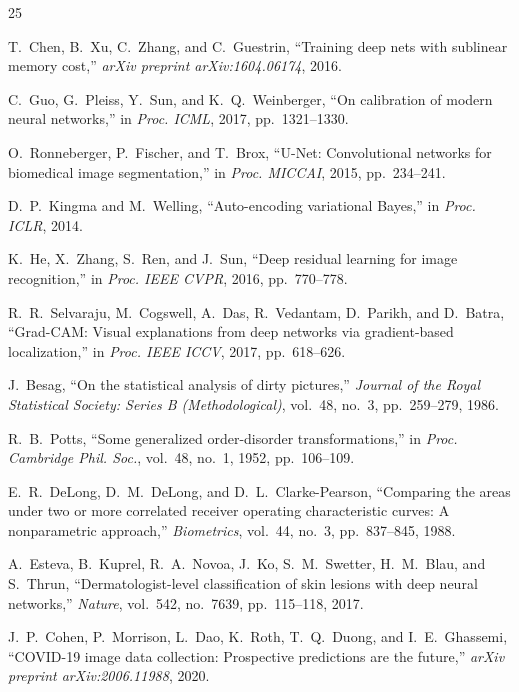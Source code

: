 \documentclass[conference]{IEEEtran}
\renewenvironment{thebibliography}[1]{%
  \begin{oldthebibliography}{#1}%
    \setlength{\itemsep}{0.3pt}%
    \setlength{\parskip}{0pt}%
}{%
  \end{oldthebibliography}%
}
\begin{document}
\begin{thebibliography}{25}
T.~Chen, B.~Xu, C.~Zhang, and C.~Guestrin, ``Training deep nets with sublinear memory cost,'' \textit{arXiv preprint arXiv:1604.06174}, 2016.

C.~Guo, G.~Pleiss, Y.~Sun, and K.~Q.~Weinberger, ``On calibration of modern neural networks,'' in \textit{Proc. ICML}, 2017, pp.~1321--1330.

O.~Ronneberger, P.~Fischer, and T.~Brox, ``U-Net: Convolutional networks for biomedical image segmentation,'' in \textit{Proc. MICCAI}, 2015, pp.~234--241.

D.~P.~Kingma and M.~Welling, ``Auto-encoding variational Bayes,'' in \textit{Proc. ICLR}, 2014.

K.~He, X.~Zhang, S.~Ren, and J.~Sun, ``Deep residual learning for image recognition,'' in \textit{Proc. IEEE CVPR}, 2016, pp.~770--778.

R.~R.~Selvaraju, M.~Cogswell, A.~Das, R.~Vedantam, D.~Parikh, and D.~Batra, ``Grad-CAM: Visual explanations from deep networks via gradient-based localization,'' in \textit{Proc. IEEE ICCV}, 2017, pp.~618--626.

J.~Besag, ``On the statistical analysis of dirty pictures,'' \textit{Journal of the Royal Statistical Society: Series B (Methodological)}, vol.~48, no.~3, pp.~259--279, 1986.

R.~B.~Potts, ``Some generalized order-disorder transformations,'' in \textit{Proc. Cambridge Phil. Soc.}, vol.~48, no.~1, 1952, pp.~106--109.

E.~R.~DeLong, D.~M.~DeLong, and D.~L.~Clarke-Pearson, ``Comparing the areas under two or more correlated receiver operating characteristic curves: A nonparametric approach,'' \textit{Biometrics}, vol.~44, no.~3, pp.~837--845, 1988.

A.~Esteva, B.~Kuprel, R.~A.~Novoa, J.~Ko, S.~M.~Swetter, H.~M.~Blau, and S.~Thrun, ``Dermatologist-level classification of skin lesions with deep neural networks,'' \textit{Nature}, vol.~542, no.~7639, pp.~115--118, 2017.

J.~P.~Cohen, P.~Morrison, L.~Dao, K.~Roth, T.~Q.~Duong, and I.~E.~Ghassemi, ``COVID-19 image data collection: Prospective predictions are the future,'' \textit{arXiv preprint arXiv:2006.11988}, 2020.


\end{thebibliography}
\end{document}
